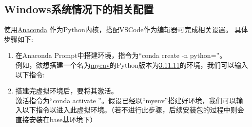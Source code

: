 \documentclass[11pt]{article}
\begin{document}
    \subsection{Windows系统情况下的相关配置}
    使用\underline{Anaconda} 作为Python内核，搭配VSCode作为编辑器可完成相关设置。
    具体步骤如下:
    \begin{enumerate}
    	\item 在Anaconda Prompt中搭建环境，指令为“conda create -n  python=”。\\
    	例如，欲想搭建一个名为\underline{myenv}的Python版本为\underline{3.11.11}的环境，我们可以输入以下指令:
    	\begin{center}
    	\end{center}
    	
    	\item 搭建完虚拟环境后，要将其激活。\\
    	激活指令为“conda activate ”。假设已经以“myenv”搭建好环境，我们可以输入以下指令以进入此虚拟环境。（若不进行此步骤，后续安装包的过程中则会直接安装在base基环境下）
    	\begin{center}
    	\end{center}
    	

\end{enumerate}
\end{document}
